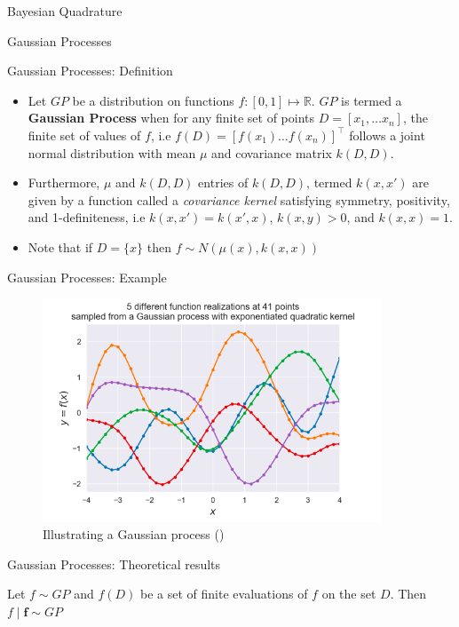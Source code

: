 \documentclass{beamer}
\begin{document}
\begin{section}{Bayesian Quadrature}
\begin{subsection}{Gaussian Processes}
\begin{frame}{Gaussian Processes: Definition}
    \begin{itemize}
        \item Let $GP$ be a distribution on functions $f: [0,1] \mapsto \mathbb{R}$. $GP$ is termed a \textbf{Gaussian Process} when for any finite set of points $D = [x_1, \ldots x_n]$, the finite set of values of $f$, i.e $f(D) = [f(x_1) \ldots f(x_n)]^{\top}$ follows a joint normal distribution with mean $\mu$ and covariance matrix $k(D,D)$. 
        \pause
        \item Furthermore, $\mu$ and $k(D,D)$ entries of $k(D,D)$, termed $k(x,x')$ are given by a function called a \textit{covariance kernel} satisfying symmetry, positivity, and 1-definiteness, i.e $k(x,x') = k(x',x)$, $k(x,y) > 0$, and $k(x,x) = 1$.
        \pause
        \item Note that if $D = \{x\}$ then $f \sim N(\mu(x), k(x,x))$
    \end{itemize}
\end{frame}

\begin{frame}{Gaussian Processes: Example}
    \begin{figure}
        \centering
        \includegraphics[width=0.9\textwidth]{GP1.png}
        \caption{Illustrating a Gaussian process (\cite{PR})}
        \label{fig:GP1}
    \end{figure}
\end{frame}
\begin{frame}{Gaussian Processes: Theoretical results}
    \begin{theorem}[\cite{PR}]
    Let $f \sim GP$ and $f(D)$ be a set of finite evaluations of $f$ on the set $D$. Then $f \mid \textbf{f} \sim GP$
    \end{theorem}
    

\end{frame}
\end{subsection}
\end{section}
\end{document}
